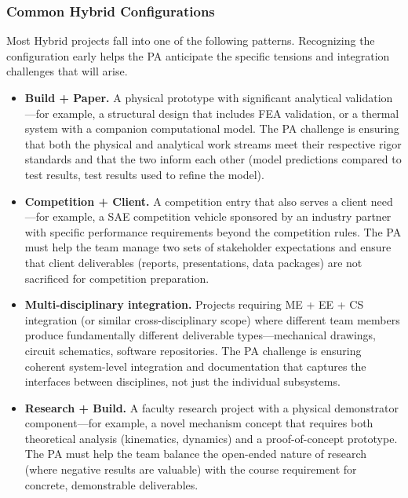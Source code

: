 \subsubsection{Common Hybrid Configurations}

Most Hybrid projects fall into one of the following patterns. Recognizing the configuration early helps the PA anticipate the specific tensions and integration challenges that will arise.

\begin{itemize}[nosep,leftmargin=1.5em]
\item \textbf{Build + Paper.} A physical prototype with significant analytical validation---for example, a structural design that includes FEA validation, or a thermal system with a companion computational model. The PA challenge is ensuring that both the physical and analytical work streams meet their respective rigor standards and that the two inform each other (model predictions compared to test results, test results used to refine the model).

\item \textbf{Competition + Client.} A competition entry that also serves a client need---for example, a SAE competition vehicle sponsored by an industry partner with specific performance requirements beyond the competition rules. The PA must help the team manage two sets of stakeholder expectations and ensure that client deliverables (reports, presentations, data packages) are not sacrificed for competition preparation.

\item \textbf{Multi-disciplinary integration.} Projects requiring ME + EE + CS integration (or similar cross-disciplinary scope) where different team members produce fundamentally different deliverable types---mechanical drawings, circuit schematics, software repositories. The PA challenge is ensuring coherent system-level integration and documentation that captures the interfaces between disciplines, not just the individual subsystems.

\item \textbf{Research + Build.} A faculty research project with a physical demonstrator component---for example, a novel mechanism concept that requires both theoretical analysis (kinematics, dynamics) and a proof-of-concept prototype. The PA must help the team balance the open-ended nature of research (where negative results are valuable) with the course requirement for concrete, demonstrable deliverables.
\end{itemize}



